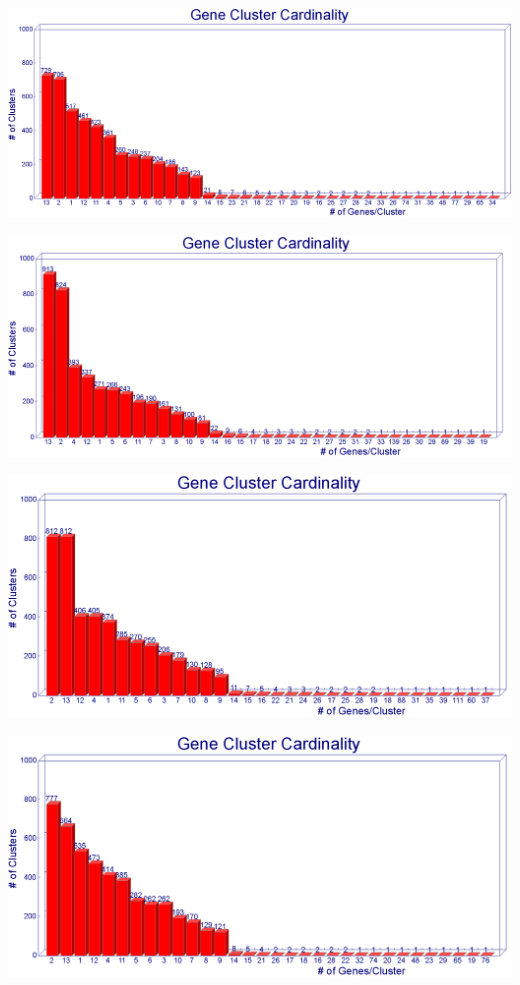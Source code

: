 \documentclass[11pt,notitlepage]{article}
\begin{document}
  \includegraphics[width=145mm]{i45_a90_graph.png}
  
  \includegraphics[width=145mm]{i60_a50_graph.png}
  
  \includegraphics[width=145mm]{i60_a70_graph.png}
  
  \includegraphics[width=145mm]{i60_a90_graph.png}
  
\end{document}
